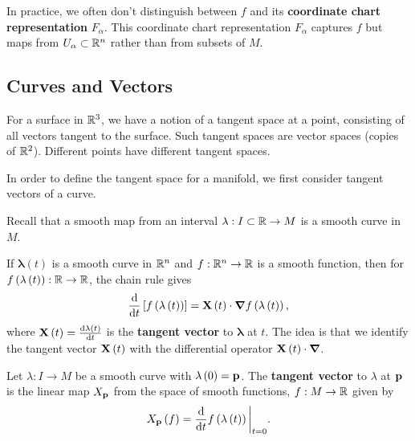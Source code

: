 \begin{examples}
\begin{enumerate}[label=\arabic*)]
        In practice, we often don't distinguish between $f$ and its \textbf{coordinate chart representation} $F_{\alpha}$. This coordinate chart representation $F_{\alpha}$ captures $f$ but maps from $U_{\alpha} \subset \mathbb{R}^{n}$ rather than from subsets of $M$.
    \end{enumerate}
\end{examples}

\subsection{Curves and Vectors}

For a surface in $\mathbb{R}^3$, we have a notion of a tangent space at a point, consisting of all vectors tangent to the surface. Such tangent spaces are vector spaces (copies of $\mathbb{R}^2$). Different points have different tangent spaces. 

In order to define the tangent space for a manifold, we first consider tangent vectors of a curve.

Recall that a smooth map from an interval $\lambda : I \subset \mathbb{R} \to M$ is a smooth curve in $M$.

If $\mathbf{\lambda} \left( t \right) $ is a smooth curve in $\mathbb{R}^{n}$ and $f : \mathbb{R}^{n} \to \mathbb{R}$ is a smooth function, then for $f \left( \mathbf{\lambda}\left( t \right)  \right) : \mathbb{R} \to \mathbb{R}$, the chain rule gives
\begin{align}
    \dv{t} \left[ f \left( \mathbf{\lambda}\left( t \right)  \right)  \right] = \vb{X}\left( t \right) \cdot \grad f\left( \mathbf{\lambda}\left( t \right)  \right) 
,\end{align}
where $\vb{X}\left( t \right) = \dv{\mathbf{\lambda}\left( t \right) }{t}$ is the \textbf{tangent vector} to $\mathbf{\lambda}$ at $t$. The idea is that we identify the tangent vector $\vb{X}\left( t \right) $ with the differential operator $\vb{X}\left( t \right) \cdot \grad $.

\begin{definition}
Let $\lambda : I \to M$ be a smooth curve with $\lambda \left( 0 \right) = \vb{p}$. The \textbf{tangent vector} to $\lambda$ at $\vb{p}$ is the linear map $X_{\vb{p}}$ from the space of smooth functions, $f : M \to \mathbb{R}$ given by
\begin{align}
    X_{\vb{p}}\left( f \right) = \dv{t} f\left( \lambda \left( t \right)  \right) \bigg|_{t = 0} \label{eq:tangent_vector}
.\end{align}
\end{definition}

